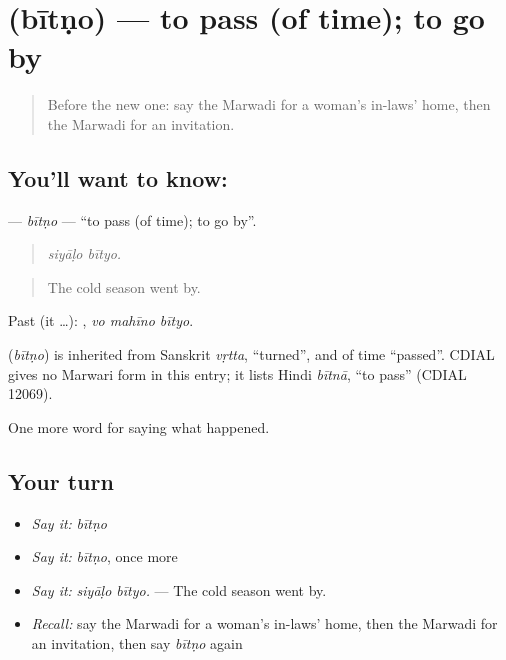 \section[\texorpdfstring{\mw{बीतणो} (bītṇo)}{बीतणो (bītṇo)}]{ (bītṇo) — to pass (of time); to go by}

\label{lesson:MW-C246-bitno}



\begin{quote}
Before the new one: say the Marwadi for a woman's in-laws' home, then the Marwadi for an invitation.
\end{quote}

\subsection*{You'll want to know: }
\textbf{} — \emph{bītṇo} — \textquotedblleft{}to pass (of time); to go by\textquotedblright{}.

\begin{quote}
 
\end{quote}

\begin{quote}
\emph{siyāḷo bītyo.}
\end{quote}

\begin{quote}
The cold season went by.
\end{quote}

Past (it …):   , \emph{vo mahīno bītyo}.

\begin{cousinweb}
\textbf{} (\emph{bītṇo}) is inherited from Sanskrit \emph{vṛtta}, \textquotedblleft{}turned\textquotedblright{}, and of time \textquotedblleft{}passed\textquotedblright{}. CDIAL gives no Marwari form in this entry; it lists Hindi \emph{bītnā}, \textquotedblleft{}to pass\textquotedblright{} (CDIAL 12069).
\end{cousinweb}

\begin{grammarlens}[title={What you've built}]
One more word for saying what happened.
\end{grammarlens}

\subsection*{Your turn}
\begin{itemize}
\raggedright
  \item \emph{Say it:} \emph{bītṇo}
  \item \emph{Say it:} \emph{bītṇo}, once more
  \item \emph{Say it:} \emph{siyāḷo bītyo.} — The cold season went by.
  \item \emph{Recall:} say the Marwadi for a woman's in-laws' home, then the Marwadi for an invitation, then say \emph{bītṇo} again
\end{itemize}

